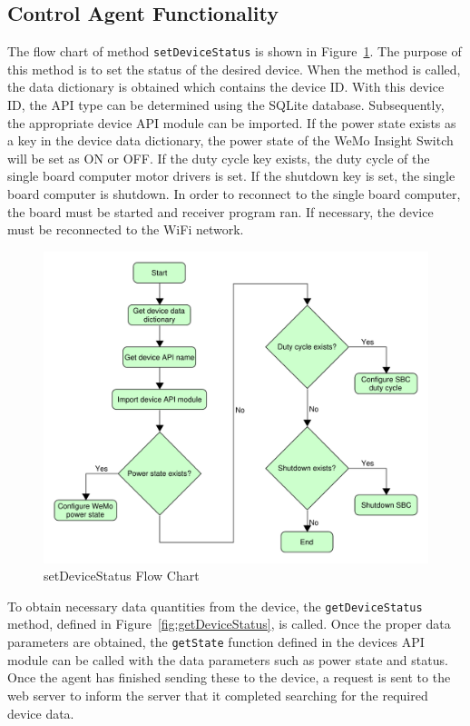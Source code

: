 \subsection{Control Agent Functionality}
The flow chart of method \texttt{setDeviceStatus} is shown in
Figure~\ref{fig:setDeviceStatus}. The purpose of this method is to set the
status of the desired device. When the method is called, the data dictionary is
obtained which contains the device ID. With this device ID, the API type can be
determined using the SQLite database. Subsequently, the appropriate device API
module can be imported. If the power state exists as a key in the device data
dictionary, the power state of the WeMo Insight Switch will be set as ON or OFF.
If the duty cycle key exists, the duty cycle of the single board computer motor
drivers is set. If the shutdown key is set, the single board computer is
shutdown. In order to reconnect to the single board computer, the board must be
started and receiver program ran. If necessary, the device must be reconnected
to the WiFi network. %
%
\begin{figure}
    \centering
    \includegraphics[scale=0.5]{figs/agents/setDeviceStatus.pdf}
    \caption{setDeviceStatus Flow Chart}
    \label{fig:setDeviceStatus}
\end{figure}

To obtain necessary data quantities from the device, the
\texttt{getDeviceStatus} method, defined in Figure~\ref{fig:getDeviceStatus}, is called. Once the proper data parameters are
obtained, the \texttt{getState} function defined in the devices API module can
be called with the data parameters such as power state and
status. Once the agent has finished sending these to the device, a request is
sent to the web server to inform the server that it completed searching for the
required device data. %

